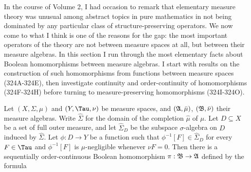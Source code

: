      
\def\chaptername{Measure algebras}
\def\sectionname{Homomorphisms}
     
     
In the course of Volume 2, I had occasion to remark that elementary
measure theory was unusual among abstract topics in pure mathematics in
not being dominated by any particular class of structure-preserving
operators.   We now come to what I think is one of the reasons for the
gap:  the most important operators of the theory are not between measure
spaces at all, but between their measure algebras.   In this section I
run through the most elementary facts about Boolean homomorphisms
between measure algebras.   I start with results on the construction of
such homomorphisms from functions between measure spaces (324A-324E),
then investigate continuity and order-continuity of homomorphisms
(324F-324H) before turning to measure-preserving homomorphisms
(324I-324O).
     
 Let $(X,\Sigma,\mu)$ and $(Y,\Tau,\nu)$
be measure spaces, and $(\frak A,\bar\mu)$, $(\frak B,\bar\nu)$ their
measure algebras.   Write $\hat\Sigma$ for the domain of the completion
$\hat\mu$ of $\mu$.   Let $D\subseteq X$ be a set of full outer
measure, and let $\hat\Sigma_D$ be the
subspace $\sigma$-algebra on $D$ induced by $\hat\Sigma$.  Let
$\phi:D\to Y$ be a function such that
$\phi^{-1}[F]\in\hat\Sigma_D$ for every $F\in\Tau$ and
$\phi^{-1}[F]$ is $\mu$-negligible whenever $\nu F=0$.   Then
there is a sequentially order-continuous Boolean homomorphism 
$\pi:\frak B\to\frak A$ defined by the formula
     
     
